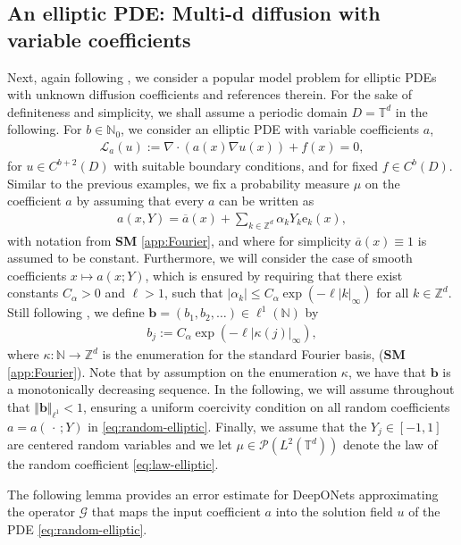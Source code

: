 \documentclass{article}
\numberwithin{equation}{section}
\newcommand{\fb}{\bm{\mathrm{e}}}
\renewcommand{\bar}{\overline}
\newcommand{\slot}{{\,\cdot\,}}
\newcommand{\T}{\mathbb{T}}
\newcommand{\N}{\mathbb{N}}
\newcommand{\Z}{\mathbb{Z}}
\newcommand{\cG}{\mathcal{G}}
\newcommand{\cL}{\mathcal{L}}
\newcommand{\cP}{\mathcal{P}}
\newcommand{\1}{\mathbbm{1}}
\begin{document}
\subsection{An elliptic PDE: Multi-d diffusion with variable coefficients}\label{app:darcy}

Next, again following \cite{LMK1}, we consider a popular model problem for elliptic PDEs with unknown diffusion coefficients \cite{CDS2011} and references therein. For the sake of definiteness and simplicity, we shall assume a periodic domain $D = \T^d$ in the following. For $b\in\N_0$, we consider an elliptic PDE with variable coefficients $a$,
\begin{align} \label{eq:random-elliptic}
\cL_a(u) := \nabla \cdot (a(x) \nabla u(x)) + f(x) = 0,
\end{align}
for $u\in C^{b+2}(D)$ with suitable boundary conditions, and for fixed $f \in C^{b}(D)$.
Similar to the previous examples, we fix a probability measure $\mu$ on the coefficient $a$ by assuming that every $a$ can be written as
\begin{align} \label{eq:law-elliptic}
a(x,Y) 
=
\overline{a}(x) 
+
\sum_{{k}\in \Z^d}
\alpha_{k} Y_k \fb_k(x),
\end{align}
with notation from \textbf{SM} \ref{app:Fourier}, and where for simplicity $\bar{a}(x) \equiv 1$ is assumed to be constant. Furthermore, we will consider the case of smooth coefficients $x \mapsto a(x;Y)$, which is ensured by requiring that there exist constants $C_\alpha>0$ and $\ell > 1$, such that $|\alpha_k|\le C_\alpha \exp(-\ell |k|_\infty)$ for all $k \in \Z^d$. Still following \cite{LMK1}, we define $\bm{b} = (b_1,b_2,\dots)\in \ell^1(\N)$ by 
\begin{align} \label{eq:elliptic-b}
b_j := C_\alpha \exp(-\ell |\kappa(j)|_\infty),
\end{align}
where $\kappa: \N \to \Z^d$ is the enumeration for the standard Fourier basis, (\textbf{SM} \ref{app:Fourier}). Note that by assumption on the enumeration $\kappa$, we have that $\bm{b}$ is a monotonically decreasing sequence. In the following, we will assume throughout that $\Vert \bm{b} \Vert_{\ell^1} < 1$, ensuring a uniform coercivity condition on all random coefficients $a = a(\slot; Y)$ in \eqref{eq:random-elliptic}. Finally, we assume that the $Y_j \in [-1,1]$ are centered random variables and we let $\mu \in \cP(L^2(\T^d))$ denote the law of the random coefficient \eqref{eq:law-elliptic}. 

The following lemma provides an error estimate for DeepONets approximating the operator $\cG$ that maps the input coefficient $a$ into the solution field $u$ of the PDE \eqref{eq:random-elliptic}. 
\end{document}

